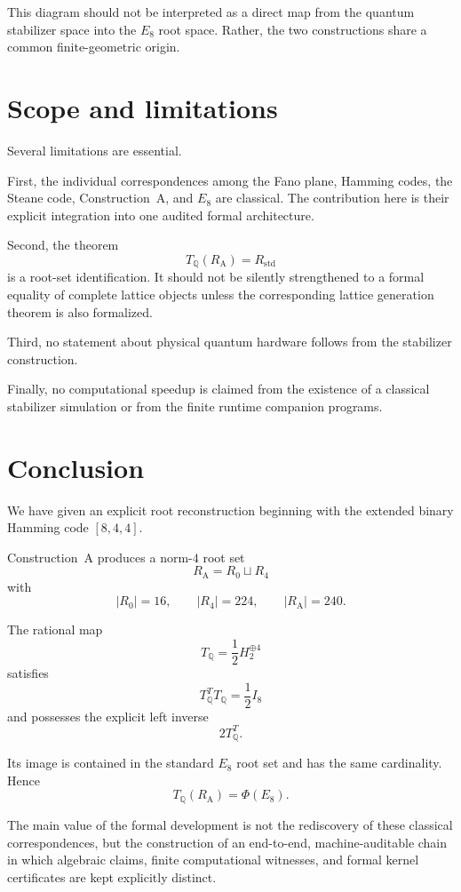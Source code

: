 \documentclass[11pt,a4paper]{article}
\theoremstyle{definition}
\theoremstyle{remark}
\newcommand{\RA}{R_{\mathrm A}}
\newcommand{\Rstd}{R_{\mathrm{std}}}
\newcommand{\TQ}{T_{\mathbb Q}}
\begin{document}
This diagram should not be interpreted as a direct map from the quantum
stabilizer space into the $E_8$ root space.  Rather, the two constructions
share a common finite-geometric origin.

\section{Scope and limitations}

Several limitations are essential.

First, the individual correspondences among the Fano plane, Hamming codes,
the Steane code, Construction~A, and $E_8$ are classical.  The contribution
here is their explicit integration into one audited formal architecture.

Second, the theorem
\[
\TQ(\RA)=\Rstd
\]
is a root-set identification.  It should not be silently strengthened to a
formal equality of complete lattice objects unless the corresponding lattice
generation theorem is also formalized.

Third, no statement about physical quantum hardware follows from the
stabilizer construction.

Finally, no computational speedup is claimed from the existence of a
classical stabilizer simulation or from the finite runtime companion
programs.

\section{Conclusion}

We have given an explicit root reconstruction beginning with the extended
binary Hamming code $[8,4,4]$.

Construction~A produces a norm-$4$ root set
\[
\RA=R_0\sqcup R_4
\]
with
\[
|R_0|=16,
\qquad
|R_4|=224,
\qquad
|\RA|=240.
\]

The rational map
\[
\TQ=\frac12H_2^{\oplus4}
\]
satisfies
\[
\TQ^T\TQ=\frac12I_8
\]
and possesses the explicit left inverse
\[
2\TQ^T.
\]

Its image is contained in the standard $E_8$ root set and has the same
cardinality.  Hence
\[
\boxed{
\TQ(\RA)=\Phi(E_8).
}
\]

The main value of the formal development is not the rediscovery of these
classical correspondences, but the construction of an end-to-end,
machine-auditable chain in which algebraic claims, finite computational
witnesses, and formal kernel certificates are kept explicitly distinct.
\end{document}
